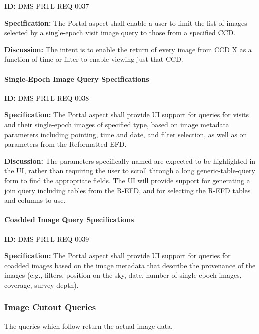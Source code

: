 \documentclass[SE,toc,lsstdraft]{lsstdoc}
\begin{document}
\label{DMS-PRTL-REQ-0037}
\textbf{ID:} DMS-PRTL-REQ-0037

\textbf{Specification:}
The Portal aspect shall enable a user to limit the list of images selected by a single-epoch visit image query to those from a specified CCD.

\textbf{Discussion:}
The intent is to enable the return of every image from CCD X as a function of time or filter to enable viewing just that CCD.

\paragraph{Single-Epoch Image Query Specifications}\hfill  %

\label{DMS-PRTL-REQ-0038}
\textbf{ID:} DMS-PRTL-REQ-0038

\textbf{Specification:}
The Portal aspect shall provide UI support for queries for visits and their single-epoch images of specified type, based on image metadata parameters including pointing, time and date, and filter selection, as well as on parameters from the Reformatted EFD.

\textbf{Discussion:}
The parameters specifically named are expected to be highlighted in the UI, rather than requiring the user to scroll through a long generic-table-query form to find the appropriate fields.  The UI will provide support for generating a join query including tables from the R-EFD, and for selecting the R-EFD tables and columns to use.

\paragraph{Coadded Image Query Specifications}\hfill  %

\label{DMS-PRTL-REQ-0039}
\textbf{ID:} DMS-PRTL-REQ-0039

\textbf{Specification:}
The Portal aspect shall provide UI support for queries for coadded images based on the image metadata that describe the provenance of the images (e.g., filters, position on the sky, date, number of single-epoch images, coverage, survey depth).

\subsubsection{Image Cutout Queries}

The queries which follow return the actual image data.
\end{document}
